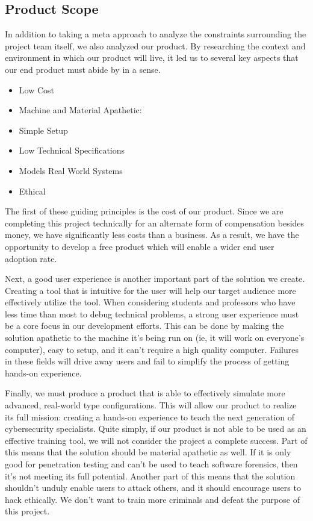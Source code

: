 \documentclass[openright]{report}
\begin{document}
\subsection{Product Scope}
In addition to taking a meta approach to analyze the constraints surrounding the project team itself, we also analyzed our product. By researching the context and environment in which our product will live, it led us to several key aspects that our end product must abide by in a sense. 
\begin{itemize}
    \item Low Cost
    \item Machine and Material Apathetic: 
    \item Simple Setup
    \item Low Technical Specifications
    \item Models Real World Systems
    \item Ethical
\end{itemize}

\par The first of these guiding principles is the cost of our product. Since we are completing this project technically for an alternate form of compensation besides money, we have significantly less costs than a business. As a result, we have the opportunity to develop a free product which will enable a wider end user adoption rate. 

\par Next, a good user experience is another important part of the solution we create. Creating a tool that is intuitive for the user will help our target audience more effectively utilize the tool. When considering students and professors who have less time than most to debug technical problems, a strong user experience must be a core focus in our development efforts. This can be done by making the solution apathetic to the machine it's being run on (ie, it will work on everyone's computer), easy to setup, and it can't require a high quality computer. Failures in these fields will drive away users and fail to simplify the process of getting hands-on experience. 

\par Finally, we must produce a product that is able to effectively simulate more advanced, real-world type configurations. This will allow our product to realize its full mission: creating a hands-on experience to teach the next generation of cybersecurity specialists. Quite simply, if our product is not able to be used as an effective training tool, we will not consider the project a complete success. Part of this means that the solution should be material apathetic as well. If it is only good for penetration testing and can't be used to teach software forensics, then it's not meeting its full potential. Another part of this means that the solution shouldn't unduly enable users to attack others, and it should encourage users to hack ethically. We don't want to train more criminals and defeat the purpose of this project.
\end{document}
